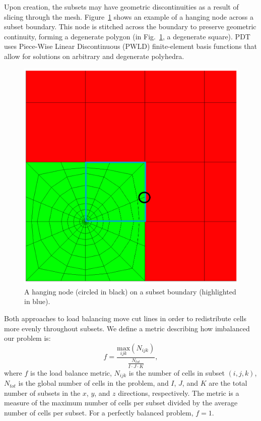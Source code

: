 Upon creation, the subsets may have geometric discontinuities as a result of slicing through the mesh.
Figure~\ref{hanging_node} shows an example of a hanging node across a subset boundary.
This node is stitched across the boundary to preserve geometric continuity, forming a degenerate polygon \cite{degenerate} (in Fig.~\ref{hanging_node}, a degenerate square).
PDT uses Piece-Wise Linear Discontinuous (PWLD) finite-element basis functions \cite{pwld_ragusa,pwld_teresa} that allow for solutions on arbitrary and degenerate polyhedra.
\begin{figure}[H]
  \centering
  \includegraphics[scale=0.2]{../../figures/hanging_node_spiderweb_example.png}
   \caption{A hanging node (circled in black) on a subset boundary (highlighted in blue).}
   \label{hanging_node}
\end{figure}

Both approaches to load balancing move cut lines in order to redistribute cells more evenly throughout subsets. We define a metric describing how imbalanced our problem is:
\begin{equation}
f =\frac{\underset{ijk}{\text{max}}(N_{ijk})}{\frac{N_{tot}}{I\cdot J\cdot K}},
\label{metric_def}
\end{equation}
where $f$ is the load balance metric, $N_{ijk}$ is the number of cells in subset $(i,j,k)$, $N_{tot}$ is the global number of cells in the problem, and $I$, $J$, and $K$ are the total number of subsets in the $x$, $y$, and $z$ directions, respectively. The metric is a measure of the maximum number of cells per subset divided by the average number of cells per subset. For a perfectly balanced problem, $f = 1$.

